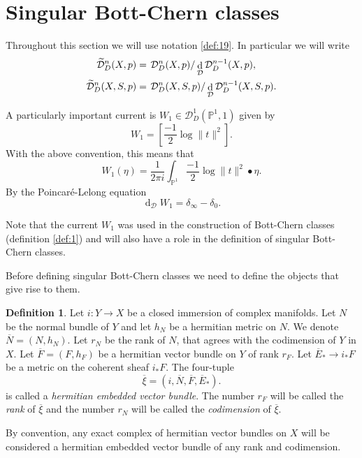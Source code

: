 \documentclass[10pt,twoside]{article}
\numberwithin{equation}{section}
\theoremstyle{plain}
\theoremstyle{definition}
\newtheorem{definition}[equation]{Definition}
\DeclareMathOperator{\dd}{d}
\begin{document}
\section{Singular Bott-Chern classes}
\label{sec:singular-bott-chern}

Throughout this section we will use notation \ref{def:19}.
In particular we will write 
\begin{align*}
  \widetilde
  {\mathcal{D}}^{n}_{D}(X,p)&=\left. \mathcal{D}^{n}_{D}(X,p)\right/
  \dd_{\mathcal{D}}\mathcal{D}^{n-1}_{D}(X,p),\\
  \widetilde
  {\mathcal{D}}^{n}_{D}(X,S,p)&=\left. \mathcal{D}^{n}_{D}(X,S,p)\right/
  \dd_{\mathcal{D}}\mathcal{D}^{n-1}_{D}(X,S,p).
\end{align*}

A particularly important current is $W_{1}\in
\mathcal{D}^{1}_{D}(\mathbb{P}^{1},1)$ given by
\begin{equation}
  \label{eq:60}
  W_{1}=[\frac{-1}{2}\log \|t\|^{2}].
\end{equation}
With the above convention, this means that
\begin{equation}
  \label{eq:61}
  W_{1}(\eta)=\frac{1}{2\pi i}\int_{\mathbb{P}^{1}}
  \frac{-1}{2}\log \|t\|^{2}\bullet \eta.
\end{equation}
By the Poincar\'e-Lelong equation
\begin{equation}
  \label{eq:62}
  \dd_{\mathcal{D}}W_{1}=\delta _{\infty}-\delta _{0}.
\end{equation}

Note that the current $W_{1}$ was used in the construction of
Bott-Chern classes (definition \ref{def:1}) and will also have a
role in the definition of singular Bott-Chern classes.


Before defining singular Bott-Chern classes we need to
define the objects that give rise to them.

\begin{definition} \label{def:8}
  Let $i\colon Y\longrightarrow X$ be a closed immersion of complex
  manifolds. Let $N$ be the normal bundle of
  $Y$ and  let $h_{N}$ be a 
  hermitian metric on $N$. We denote $\overline N=(N,h_{N})$. Let
  $r_{N}$ be the rank of $N$, that agrees 
  with the codimension of $Y$ in $X$. Let
  $\overline F=(F,h_{F})$ be a hermitian vector bundle on $Y$ of rank
  $r_{F}$. Let  $\overline{E}_{\ast}\to i_{\ast}F$ be a metric on the
  coherent sheaf $i_{\ast}F$.
  The four-tuple 
  \begin{equation}
    \label{eq:40}
    \overline {\xi}=(i,\overline N,\overline
    F, \overline E_{\ast}). 
  \end{equation}  
  is called a \emph{hermitian embedded vector bundle}. The number
  $r_{F}$ will be called the \emph{rank} of $\overline {\xi}$ and the
  number $r_{N}$ will be called the \emph{codimension} of $\overline {\xi}$.

  By convention, any exact complex of hermitian vector bundles on $X$
  will be considered a hermitian embedded vector bundle of any rank
  and codimension.
\end{definition}
\end{document}
